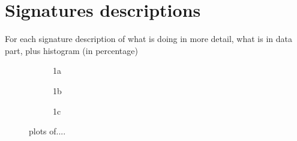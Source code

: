\chapter{Signatures descriptions} \label{app:signatures} \label{app:histogram} \label{app:frequecies}

For each signature description of what is doing in more detail, what is in data part, plus histogram (in percentage)

\begin{figure}
    \centering
    \begin{subfigure}{.33\textwidth}
      \centering
      \caption{1a}
      \label{fig:sfig1}
    \end{subfigure}%
    \begin{subfigure}{.33\textwidth}
      \centering
      \caption{1b}
      \label{fig:sfig2}
    \end{subfigure}
    \begin{subfigure}{.33\textwidth}
        \centering
        \caption{1c}
        \label{fig:sfig3}
    \end{subfigure}
    \caption{plots of....}
    \label{fig:fig}
\end{figure}




